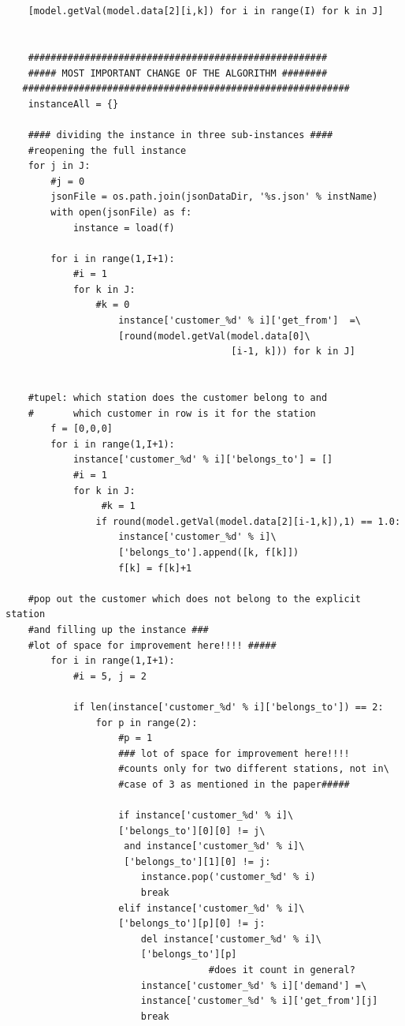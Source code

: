 \documentclass[a4paper,12pt,parskip,bibtotoc,liststotoc]{article}
\begin{document}
\begin{appendix}
\begin{lstlisting}
        
    
    [model.getVal(model.data[2][i,k]) for i in range(I) for k in J]


    #####################################################
    ##### MOST IMPORTANT CHANGE OF THE ALGORITHM ########
   ##########################################################
    instanceAll = {}
    
    #### dividing the instance in three sub-instances ####
    #reopening the full instance
    for j in J:  
        #j = 0     
        jsonFile = os.path.join(jsonDataDir, '%s.json' % instName)
        with open(jsonFile) as f:
            instance = load(f)
            
        for i in range(1,I+1):
            #i = 1
            for k in J:
                #k = 0                
                    instance['customer_%d' % i]['get_from']  =\
                    [round(model.getVal(model.data[0]\
                                        [i-1, k])) for k in J]
            
    
    #tupel: which station does the customer belong to and
    #       which customer in row is it for the station           
        f = [0,0,0] 
        for i in range(1,I+1):
            instance['customer_%d' % i]['belongs_to'] = []
            #i = 1
            for k in J:
                 #k = 1
                if round(model.getVal(model.data[2][i-1,k]),1) == 1.0:             
                    instance['customer_%d' % i]\
                    ['belongs_to'].append([k, f[k]])
                    f[k] = f[k]+1

    #pop out the customer which does not belong to the explicit station
    #and filling up the instance ###
    #lot of space for improvement here!!!! #####
        for i in range(1,I+1):
            #i = 5, j = 2
            
            if len(instance['customer_%d' % i]['belongs_to']) == 2:
                for p in range(2):
                    #p = 1
                    ### lot of space for improvement here!!!!
                    #counts only for two different stations, not in\
                    #case of 3 as mentioned in the paper#####
                    
                    if instance['customer_%d' % i]\
                    ['belongs_to'][0][0] != j\
                     and instance['customer_%d' % i]\
                     ['belongs_to'][1][0] != j:
                        instance.pop('customer_%d' % i)
                        break
                    elif instance['customer_%d' % i]\
                    ['belongs_to'][p][0] != j:
                        del instance['customer_%d' % i]\
                        ['belongs_to'][p]
                                    #does it count in general?
                        instance['customer_%d' % i]['demand'] =\
                        instance['customer_%d' % i]['get_from'][j]
                        break
                    

\end{lstlisting}
\end{appendix}
\end{document}
